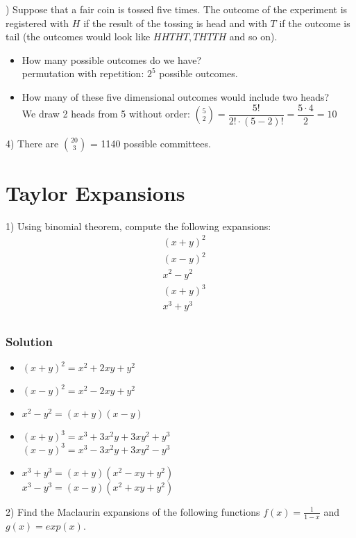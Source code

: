 \documentclass[12pt,a4paper,titlepage]{article}\usepackage[]{graphicx}\usepackage[]{color}
\begin{document}
) Suppose that a fair coin is tossed five times. The outcome of the experiment is registered with $ H $ if the result of the tossing is head and with $ T $ if the outcome is tail (the outcomes would look like $ HHTHT, THTTH $ and so on).
\begin{itemize}
  \item How many possible outcomes do we have?\\
permutation with repetition: $2^5$ possible outcomes.
  \item How many of these five dimensional outcomes would include two heads?\\
We draw 2 heads from 5 without order: ${5 \choose 2} = \dfrac{5!}{2!\cdot(5-2)!}=\dfrac{5\cdot4}{2}=10$
\end{itemize}
4) There are ${20 \choose 3}$ = 1140 possible committees.


\section{Taylor Expansions}
1) Using binomial theorem, compute the following expansions:
\begin{align*}
 &(x+y)^{2}  \\
 &(x-y)^{2}\\
 &x^{2}-y^{2}\\
 &(x+y)^{3} \\
 &x^{3}+y^{3}\\
\end{align*}
\subsubsection*{Solution}
\begin{itemize}
\item $(x+y)^{2}=x^{2}+2xy+y^{2}$
\item $(x-y)^{2}=x^{2}-2xy+y^{2}$
\item $ x^{2}-y^{2}=(x+y)(x-y) $
\item $ (x+y)^{3}=x^{3}+3x^{2}y+3xy^{2}+y^{3} $  \\
 $ (x-y)^3=x^{3}-3x^{2}y+3xy^{2}-y^{3} $
\item $ x^{3}+y^{3}=(x+y)(x^{2}-xy+y^{2}) $\\
 $ x^{3}-y^{3}=(x-y)(x^{2}+xy+y^{2}) $
\end{itemize}
2) Find the Maclaurin expansions of the following functions
$ f(x)=\frac{1}{1-x} $ and $ g(x)=exp(x)$.
\end{document}

